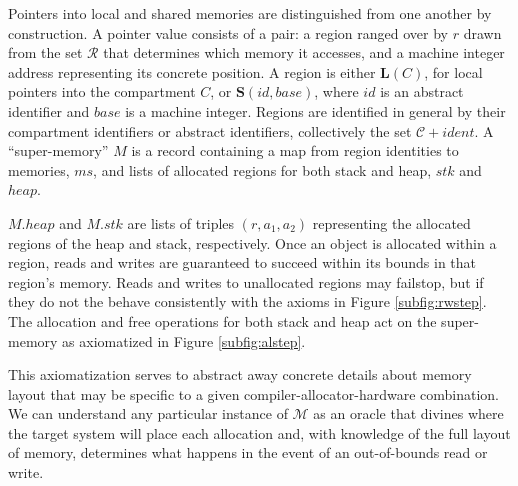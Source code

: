 \documentclass{article}
\begin{document}
Pointers into local and shared memories are distinguished from one another by construction.
A pointer value consists of a pair: a region ranged over by \(r\) drawn from the set
\(\mathcal{R}\) that determines which memory it accesses, and a machine integer address representing
its concrete position. A region is either \(\mathbf{L}(C)\), for local pointers into
the compartment \(C\), or \(\mathbf{S}(id,\mathit{base})\), where \(id\) is an
abstract identifier and \(\mathit{base}\) is a machine integer. Regions are identified
in general by their compartment identifiers or abstract identifiers, collectively
the set \(\mathcal{C} + \mathit{ident}\). A ``super-memory'' \(M\)
is a record containing a map from region identities to memories, \(ms\),
and lists of allocated regions for both stack and heap, \(stk\) and \(heap\).

\(M.heap\) and \(M.stk\) are lists of triples \((r, a_1, a_2)\) representing
the allocated regions of the heap and stack, respectively.
Once an object is allocated within a region, reads and writes are guaranteed to succeed
within its bounds in that region's memory. Reads and writes to unallocated regions may
failstop, but if they do not the behave consistently with the axioms in Figure \ref{subfig:rwstep}.
The allocation and free operations for both stack and heap act on the super-memory
as axiomatized in Figure \ref{subfig:alstep}.

This axiomatization serves to abstract away concrete details about memory layout
that may be specific to a given compiler-allocator-hardware combination. We can
understand any particular instance of \(\mathcal{M}\) as an oracle that divines where
the target system will place each allocation and, with knowledge of the full layout of
memory, determines what happens in the event of an out-of-bounds read or write.
\end{document}
